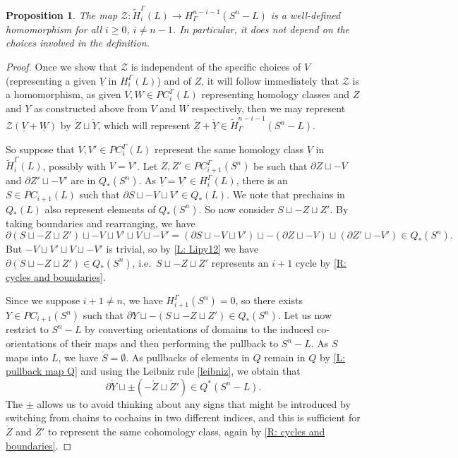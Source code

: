 \documentclass[12pt]{article}
\theoremstyle{plain}
\newtheorem{proposition}[theorem]{Proposition}
\theoremstyle{definition}
\theoremstyle{remark}
\newcommand{\uW}{\underline{W}}
\newcommand{\uV}{\underline{V}}
\newcommand{\td}[1]{\tilde{#1}}
\newcommand{\mr}[1]{\mathring{#1}}
\newcommand{\bd}{\partial}
\newcommand{\mc}[1]{\mathcal{#1}}
\begin{document}
\begin{proposition}
The map $\mc Z \colon \td H_i^\Gamma(L) \to H^{n-i-1}_\Gamma(S^n-L)$ is a well-defined homomorphism for all $i \geq 0$, $i \neq n-1$.
In particular, it does not depend on the choices involved in the definition.
\end{proposition}
\begin{proof}
Once we show that $\mc Z$ is independent of the specific choices of $V$ (representing a given $\uV$ in $H_i^\Gamma(L)$) and of $Z$, it will follow immediately that $\mc Z$ is a homomorphism, as given $V,W\in PC_i^\Gamma(L)$ representing homology classes and $Z$ and $Y$ as constructed above from $V$ and $W$ respectively, then we may represent $\mc Z(\uV + \uW)$ by $\mathring Z \sqcup \mr Y$, which will represent $\underline{\mr Z}+\underline{\mr Y}\in \td H^{n-i-1}_\Gamma(S^n-L)$.

So suppose that $V,V' \in PC_i^\Gamma(L)$ represent the same homology class $\uV$ in $\td H_i^\Gamma(L)$, possibly with $V = V'$.
Let $Z,Z' \in PC_{i+1}^\Gamma(S^n)$ be such that $\bd Z \sqcup -V$ and $\bd Z' \sqcup -V'$ are in $Q_*(S^n)$.
As $\uV=\underline{V'} \in H_i^\Gamma(L)$, there is an $S \in PC_{i+1}(L)$ such that $\bd S \sqcup -V \sqcup V' \in Q_*(L)$.
We note that prechains in $Q_*(L)$ also represent elements of $Q_*(S^n)$.
So now consider $S \sqcup -Z \sqcup Z'$.
By taking boundaries and rearranging, we have $$\bd (S \sqcup -Z \sqcup Z')\sqcup -V \sqcup V' \sqcup V \sqcup -V' = (\bd S \sqcup -V \sqcup V')\sqcup -(\bd Z \sqcup -V) \sqcup (\bd Z'\sqcup -V')\in Q_*(S^n).$$
But  $-V \sqcup V' \sqcup V \sqcup -V'$ is trivial, so by \cref{L: Lipy12} we have $\bd(S \sqcup -Z \sqcup Z')\in Q_*(S^n)$, i.e.\ $S \sqcup -Z \sqcup Z'$ represents an $i+1$ cycle by \cref{R: cycles and boundaries}.

Since we suppose $i+1\neq n$, we have $H_{i+1}^\Gamma(S^n) = 0$, so there exists $Y \in PC_{i+1}(S^n)$ such that $\bd Y \sqcup -(S \sqcup -Z \sqcup Z') \in Q_*(S^n)$.
Let us now restrict to $S^n-L$ by converting orientations of domains to the induced co-orientations of their maps and then performing the pullback to $S^n-L$.
As $S$ maps into $L$, we have $\mr S = \emptyset$.
As pullbacks of elements in $Q$ remain in $Q$ by \cref{L: pullback map Q} and using the Leibniz rule \cref{leibniz}, we obtain that $$\bd \mr Y \sqcup \pm (-\mr Z \sqcup \mr Z') \in Q^*(S^n-L).$$
The $\pm$ allows us to avoid thinking about any signs that might be introduced by switching from chains to cochains in two different indices, and this is sufficient for $\mr Z$ and $\mr Z'$ to represent the same cohomology class, again by \cref{R: cycles and boundaries}.
\end{proof}
\end{document}
